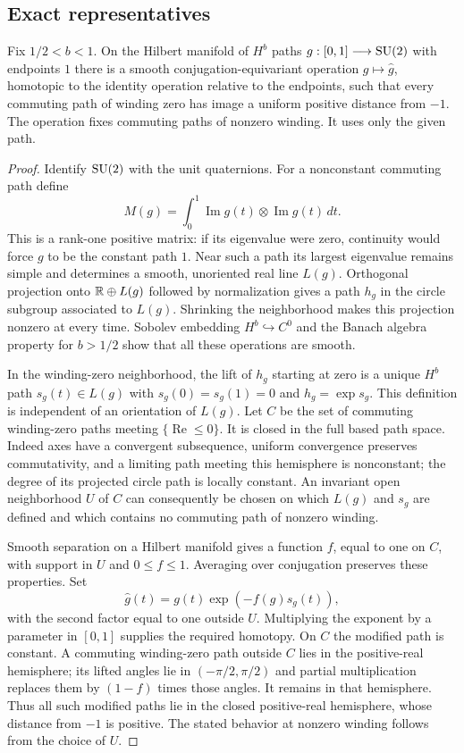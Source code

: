 \subsection{Exact representatives}

\begin{lemma}\label{lem:analysis:zero-winding}
Fix $1/2<b<1$.  On the Hilbert manifold of $H^b$ paths
$g:[0,1]\longrightarrow\operatorname{SU}(2)$ with endpoints $1$ there is a smooth
conjugation-equivariant operation $g\mapsto\widehat g$, homotopic to the
identity operation relative to the endpoints, such that every commuting
path of winding zero has image a uniform positive distance from $-1$.
The operation fixes commuting paths of nonzero winding.  It uses only
the given path.
\end{lemma}
\begin{proof}
Identify $\operatorname{SU}(2)$ with the unit quaternions.  For a nonconstant commuting
path define
\[
 M(g)=\int_0^1\operatorname{Im}g(t)\otimes
                    \operatorname{Im}g(t)\,dt.
\]
This is a rank-one positive matrix: if its eigenvalue were zero, continuity
would force $g$ to be the constant path $1$.  Near such a path its largest
eigenvalue remains simple and determines a smooth, unoriented real line
$L(g)$.  Orthogonal projection onto $\mathbb R\oplus L(g)$ followed by
normalization gives a path $h_g$ in the circle subgroup associated to
$L(g)$.  Shrinking the neighborhood makes this projection nonzero at
every time.  Sobolev embedding $H^b\hookrightarrow C^0$ and the Banach
algebra property for $b>1/2$ show that all these operations are smooth.

In the winding-zero neighborhood, the lift of $h_g$ starting at zero is
a unique $H^b$ path $s_g(t)\in L(g)$ with $s_g(0)=s_g(1)=0$ and
$h_g=\exp s_g$.  This definition is independent of an orientation of
$L(g)$.  Let $C$ be the set of commuting winding-zero paths meeting
$\{\operatorname{Re}\leq0\}$.  It is closed in the full based path space.
Indeed axes have a convergent subsequence, uniform convergence preserves
commutativity, and a limiting path meeting this hemisphere is
nonconstant; the degree of its projected circle path is locally
constant.  An invariant open neighborhood $U$ of $C$ can consequently
be chosen on which $L(g)$ and $s_g$ are defined and which contains no
commuting path of nonzero winding.

Smooth separation on a Hilbert manifold gives a function $f$, equal to
one on $C$, with support in $U$ and $0\leq f\leq1$.  Averaging over
conjugation preserves these properties.  Set
\[
 \widehat g(t)=g(t)\exp(-f(g)s_g(t)),
\]
with the second factor equal to one outside $U$.  Multiplying the exponent
by a parameter in $[0,1]$ supplies the required homotopy.  On $C$ the
modified path is constant.  A commuting winding-zero path outside $C$
lies in the positive-real hemisphere; its lifted angles lie in
$(-\pi/2,\pi/2)$ and partial multiplication replaces them by
$(1-f)$ times those angles.  It remains in that hemisphere.  Thus all
such modified paths lie in the closed positive-real hemisphere, whose
distance from $-1$ is positive.  The stated behavior at nonzero winding
follows from the choice of $U$.
\end{proof}

